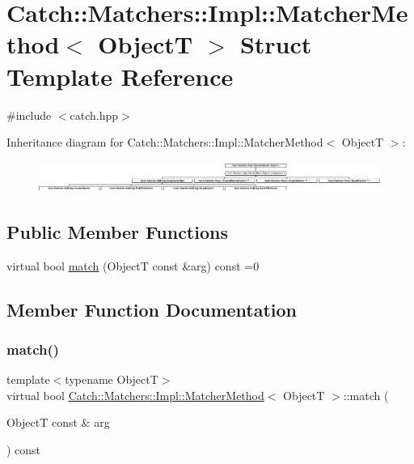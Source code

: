 \hypertarget{structCatch_1_1Matchers_1_1Impl_1_1MatcherMethod}{}\section{Catch\+:\+:Matchers\+:\+:Impl\+:\+:Matcher\+Method$<$ ObjectT $>$ Struct Template Reference}
\label{structCatch_1_1Matchers_1_1Impl_1_1MatcherMethod}


{\ttfamily \#include $<$catch.\+hpp$>$}

Inheritance diagram for Catch\+:\+:Matchers\+:\+:Impl\+:\+:Matcher\+Method$<$ ObjectT $>$\+:\begin{figure}[H]
\begin{center}
\leavevmode
\includegraphics[height=1.006289cm]{structCatch_1_1Matchers_1_1Impl_1_1MatcherMethod}
\end{center}
\end{figure}
\subsection*{Public Member Functions}
\begin{DoxyCompactItemize}
\item 
virtual bool \mbox{\hyperlink{structCatch_1_1Matchers_1_1Impl_1_1MatcherMethod_ae0920ff9e817acf08e1bb0cbcb044e30}{match}} (ObjectT const \&arg) const =0
\end{DoxyCompactItemize}


\subsection{Member Function Documentation}
\mbox{\label{structCatch_1_1Matchers_1_1Impl_1_1MatcherMethod_ae0920ff9e817acf08e1bb0cbcb044e30}} 
\subsubsection{\texorpdfstring{match()}{match()}}
{\footnotesize\ttfamily template$<$typename ObjectT$>$ \\
virtual bool \mbox{\hyperlink{structCatch_1_1Matchers_1_1Impl_1_1MatcherMethod}{Catch\+::\+Matchers\+::\+Impl\+::\+Matcher\+Method}}$<$ ObjectT $>$\+::match (\begin{DoxyParamCaption}\item[{ObjectT const \&}]{arg }\end{DoxyParamCaption}) const\hspace{0.3cm}{\ttfamily [pure virtual]}}



